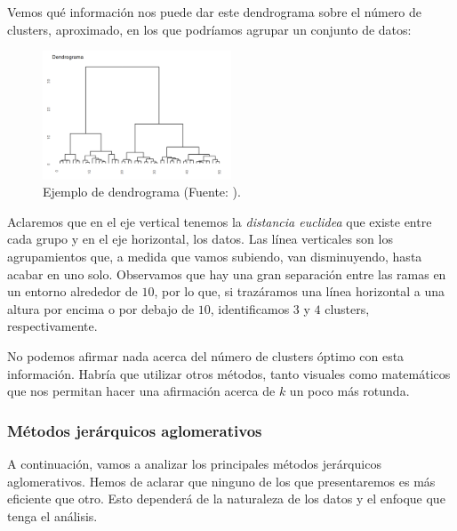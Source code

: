\begin{ejemplo}

    Vemos qué información nos puede dar este dendrograma sobre el número de clusters, aproximado, en los que podríamos agrupar un conjunto de datos:

    \begin{figure}[h]
        \centering
        \includegraphics[width=0.5\textwidth]{../img/dendrograma-1.png}
        \caption{Ejemplo de dendrograma (Fuente: \cite{bejar-AC-2}).}
    \end{figure}

    \FloatBarrier

    Aclaremos que en el eje vertical tenemos la \textit{distancia euclidea} que existe entre cada grupo y en el eje horizontal, los datos. Las línea verticales son los
    agrupamientos que, a medida que vamos subiendo, van disminuyendo, hasta acabar en uno solo. Observamos que hay una gran separación entre las ramas en un entorno alrededor
    de $10$, por lo que, si trazáramos una línea horizontal a una altura por encima o por debajo de $10$, identificamos $3$ y $4$ clusters, respectivamente. \newline

    No podemos afirmar nada acerca del número de clusters óptimo con esta información. Habría que utilizar otros métodos, tanto visuales como matemáticos que nos permitan
    hacer una afirmación acerca de $k$ un poco más rotunda.

\end{ejemplo}


\subsubsection{Métodos jerárquicos aglomerativos}  %

A continuación, vamos a analizar los principales métodos jerárquicos aglomerativos. Hemos de aclarar que ninguno de los que presentaremos es más eficiente que otro. Esto 
dependerá de la naturaleza de los datos y el enfoque que tenga el análisis. \newline


